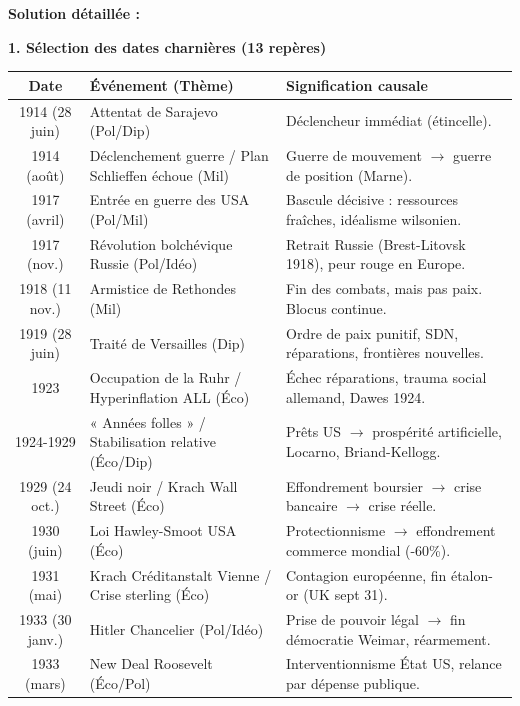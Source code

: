 \documentclass[11pt]{article}
\begin{document}
\begin{exoresolu}
\tcblower
\textbf{Solution détaillée :}

\noindent \textbf{1. Sélection des dates charnières (13 repères)}

\begin{center}
\begin{tabularx}{\linewidth}{|c|X|X|}\hline
\textbf{Date} & \textbf{Événement (Thème)} & \textbf{Signification causale} \\ \hline
1914 (28 juin) & Attentat de Sarajevo (Pol/Dip) & Déclencheur immédiat (étincelle). \\ \hline
1914 (août) & Déclenchement guerre / Plan Schlieffen échoue (Mil) & Guerre de mouvement $\rightarrow$ guerre de position (Marne). \\ \hline
1917 (avril) & Entrée en guerre des USA (Pol/Mil) & Bascule décisive : ressources fraîches, idéalisme wilsonien. \\ \hline
1917 (nov.) & Révolution bolchévique Russie (Pol/Idéo) & Retrait Russie (Brest-Litovsk 1918), peur rouge en Europe. \\ \hline
1918 (11 nov.) & Armistice de Rethondes (Mil) & Fin des combats, mais pas paix. Blocus continue. \\ \hline
1919 (28 juin) & Traité de Versailles (Dip) & Ordre de paix punitif, SDN, réparations, frontières nouvelles. \\ \hline
1923 & Occupation de la Ruhr / Hyperinflation ALL (Éco) & Échec réparations, trauma social allemand, Dawes 1924. \\ \hline
1924-1929 & « Années folles » / Stabilisation relative (Éco/Dip) & Prêts US $\rightarrow$ prospérité artificielle, Locarno, Briand-Kellogg. \\ \hline
1929 (24 oct.) & Jeudi noir / Krach Wall Street (Éco) & Effondrement boursier $\rightarrow$ crise bancaire $\rightarrow$ crise réelle. \\ \hline
1930 (juin) & Loi Hawley-Smoot USA (Éco) & Protectionnisme $\rightarrow$ effondrement commerce mondial (-60\%). \\ \hline
1931 (mai) & Krach Créditanstalt Vienne / Crise sterling (Éco) & Contagion européenne, fin étalon-or (UK sept 31). \\ \hline
1933 (30 janv.) & Hitler Chancelier (Pol/Idéo) & Prise de pouvoir légal $\rightarrow$ fin démocratie Weimar, réarmement. \\ \hline
1933 (mars) & New Deal Roosevelt (Éco/Pol) & Interventionnisme État US, relance par dépense publique. \\ \hline
\end{tabularx}
\end{center}


\end{exoresolu}
\end{document}
